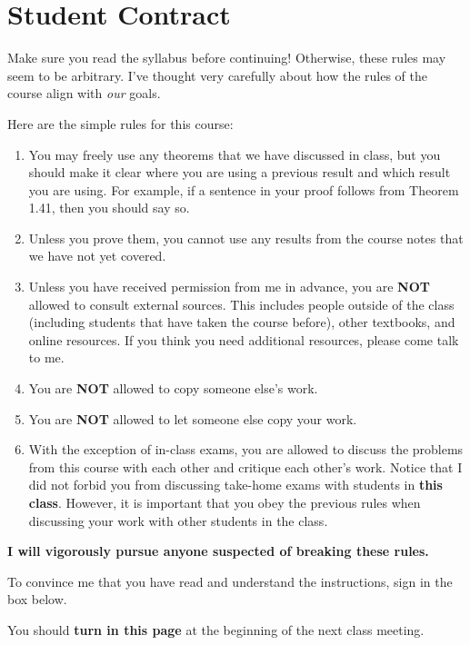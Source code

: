 \documentclass[11pt]{article}
\begin{document}
\section*{Student Contract}

Make sure you read the syllabus before continuing!  Otherwise, these rules may seem to be arbitrary.  I've thought very carefully about how the rules of the course align with \emph{our} goals.

\bigskip

\noindent Here are the simple rules for this course:

\begin{enumerate}
\item You may freely use any theorems that we have discussed in class, but you should make it clear where you are using a previous result and which result you are using.  For example, if a sentence in your proof follows from Theorem 1.41, then you should say so.
\item Unless you prove them, you cannot use any results from the course notes that we have not yet covered.
\item Unless you have received permission from me in advance, you are \textbf{NOT} allowed to consult external sources.  This includes people outside of the class (including students that have taken the course before), other textbooks, and online resources.  If you think you need additional resources, please come talk to me.
\item You are \textbf{NOT} allowed to copy someone else's work.
\item You are \textbf{NOT} allowed to let someone else copy your work.
\item With the exception of in-class exams, you are allowed to discuss the problems from this course with each other and critique each other's work.  Notice that I did not forbid you from discussing take-home exams with students in \textbf{this class}.  However, it is important that you obey the previous rules when discussing your work with other students in the class.
\end{enumerate}

\begin{center}
\textbf{I will vigorously pursue anyone suspected of breaking these rules.}
\end{center}

\bigskip

\noindent To convince me that you have read and understand the instructions, sign in the box below.

\bigskip


\bigskip

\noindent You should \textbf{turn in this page} at the beginning of the next class meeting.
\end{document}
